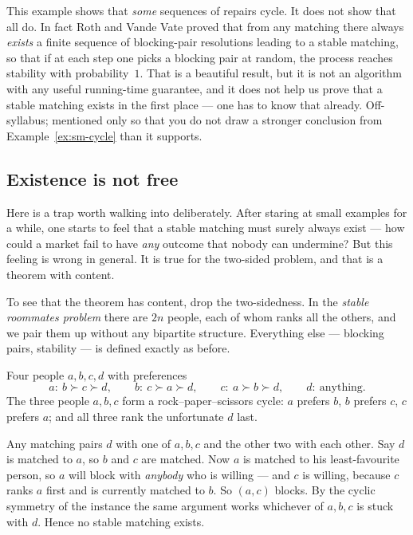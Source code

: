 \begin{remark}
This example shows that \emph{some} sequences of repairs cycle. It does not
show that all do. In fact Roth and Vande Vate proved that from any matching
there always \emph{exists} a finite sequence of blocking-pair resolutions
leading to a stable matching, so that if at each step one picks a blocking
pair at random, the process reaches stability with probability~$1$. That is a
beautiful result, but it is not an algorithm with any useful running-time
guarantee, and it does not help us prove that a stable matching exists in the
first place --- one has to know that already. Off-syllabus; mentioned only so
that you do not draw a stronger conclusion from Example~\ref{ex:sm-cycle} than it
supports.
\end{remark}

\subsection{Existence is not free}\label{sec:sm-roommates}

Here is a trap worth walking into deliberately. After staring at small
examples for a while, one starts to feel that a stable matching must surely
always exist --- how could a market fail to have \emph{any} outcome that
nobody can undermine? But this feeling is wrong in general. It is true for the
two-sided problem, and that is a theorem with content.

To see that the theorem has content, drop the two-sidedness. In the
\emph{stable roommates problem} there are $2n$ people, each of whom ranks all
the others, and we pair them up without any bipartite structure. Everything
else --- blocking pairs, stability --- is defined exactly as before.

\begin{example}\label{ex:sm-roommates}
Four people $a,b,c,d$ with preferences
\[
  a:\ b \succ c \succ d, \qquad
  b:\ c \succ a \succ d, \qquad
  c:\ a \succ b \succ d, \qquad
  d:\ \text{anything}.
\]
The three people $a,b,c$ form a rock--paper--scissors cycle: $a$ prefers $b$,
$b$ prefers $c$, $c$ prefers $a$; and all three rank the unfortunate $d$ last.

Any matching pairs $d$ with one of $a,b,c$ and the other two with each other.
Say $d$ is matched to $a$, so $b$ and $c$ are matched. Now $a$ is matched to
his least-favourite person, so $a$ will block with \emph{anybody} who is
willing --- and $c$ is willing, because $c$ ranks $a$ first and is currently
matched to $b$. So $(a,c)$ blocks. By the cyclic symmetry of the instance the
same argument works whichever of $a,b,c$ is stuck with $d$. Hence no stable
matching exists.
\end{example}

